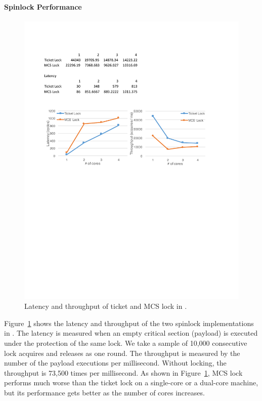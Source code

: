 \paragraph{Spinlock Performance}
\begin{figure}\centering
		\includegraphics[width=14cm]{figs/locks.pdf}
		\caption{Latency and throughput of ticket and MCS lock in \cCTOS{}.}
		\label{fig:eval_spin}		\hrulefill
\end{figure}

Figure~\ref{fig:eval_spin} shows the latency and throughput of the two
spinlock implementations in \cCTOS. The latency is measured when an
empty critical section (payload) is executed under the protection of the
same lock. We take a sample of 10,000 consecutive lock acquires and
releases as one round.  The throughput is measured by the
number of the payload executions per millisecond. Without locking, the
throughput  is 73,500 times per millisecond.  As shown
in Figure~\ref{fig:eval_spin}, MCS lock performs much worse than the
ticket lock on a single-core or a dual-core machine, but its
performance gets better as the number of cores increases.


